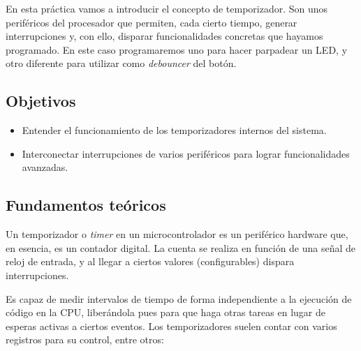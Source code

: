 \documentclass[../main.tex]{subfiles}
\begin{document}

    En esta práctica vamos a introducir el concepto de temporizador. Son unos periféricos del procesador que permiten, cada cierto tiempo, generar interrupciones y, con ello, disparar funcionalidades concretas que hayamos programado. En este caso programaremos uno para hacer parpadear un LED, y otro diferente para utilizar como \emph{debouncer} del botón.

    \subsection{Objetivos}

        \begin{itemize}
            \item Entender el funcionamiento de los temporizadores internos del sistema.
            \item Interconectar interrupciones de varios periféricos para lograr funcionalidades avanzadas.
        \end{itemize}

    \subsection{Fundamentos teóricos}

        Un temporizador o \emph{timer} en un microcontrolador es un periférico hardware que, en esencia, es un contador digital. La cuenta se realiza en función de una señal de reloj de entrada, y al llegar a ciertos valores (configurables) dispara interrupciones.

        Es capaz de medir intervalos de tiempo de forma independiente a la ejecución de código en la CPU, liberándola pues para que haga otras tareas en lugar de esperas activas a ciertos eventos. Los temporizadores suelen contar con varios registros para su control, entre otros:
\end{document}
